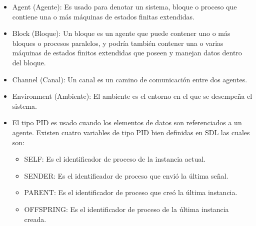 \begin{itemize}
 \item Agent (Agente): Es usado para denotar un sistema, bloque o 
proceso que contiene una o m\'as m\'aquinas de estados finitas extendidas.
\item Block (Bloque): Un bloque es un agente que puede contener uno o m\'as 
bloques o procesos paralelos, y podr\'ia tambi\'en contener una o varias 
m\'aquinas de estados finitos extendidas que poseen y manejan datos dentro del 
bloque.
\item Channel (Canal): Un canal es un camino de comunicaci\'on entre dos 
agentes.
\item Environment (Ambiente): El ambiente es el entorno en el que se 
desempe\~na el sistema. 

\item El tipo PID es usado cuando los elementos de datos son referenciados 
a un agente. Existen cuatro variables de tipo PID bien definidas en SDL  las cuales 
son:

\begin{itemize}
 \item SELF: Es el identificador de proceso de la instancia actual.
 \item SENDER: Es el identificador de proceso que envi\'o la \'ultima se\~nal.
 \item PARENT: Es el identificador de proceso que cre\'o la \'ultima instancia.
 \item OFFSPRING: Es el identificador de proceso de la \'ultima instancia 
creada.

\end{itemize}


\end{itemize}
